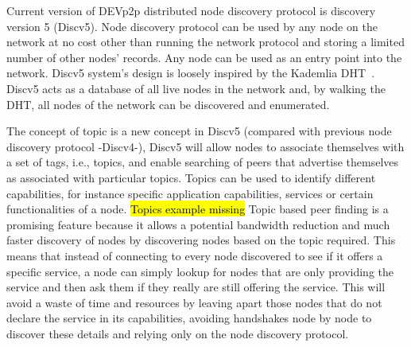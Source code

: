 Current version of DEVp2p distributed node discovery protocol is discovery version 5 (Discv5).
Node discovery protocol can be used by any node on the network  at no cost other than running the network protocol and storing a limited number of other nodes' records. 
Any node can be used as an entry point into the network.
Discv5 system's design is loosely inspired by the Kademlia DHT~\cite{}.
Discv5 acts as a database of all live nodes in the network %
and,  by walking the DHT,  all nodes of the network can be discovered and enumerated.


The concept of topic is a new concept in Discv5 (compared with previous node discovery protocol -Discv4-),  
Discv5 will allow nodes to associate themselves with a set of tags, i.e., topics, and enable searching of peers that advertise themselves as associated with particular topics.  
Topics can be used to identify different  capabilities, for instance specific application capabilities,  services or certain functionalities of a node. 
\hl{Topics example missing}
Topic based peer finding is a promising feature because it allows a potential bandwidth reduction and much faster discovery of nodes
by  discovering nodes based on the topic required.
This means that instead of connecting to every node discovered to see if it offers a specific service,  a node can simply lookup for nodes that are only providing the service and then ask them if they really are still offering the service.
This will avoid a waste of time and resources by leaving apart those nodes that do not declare the service in its capabilities,  avoiding handshakes node by node to discover these details and relying only on the node discovery protocol. 

